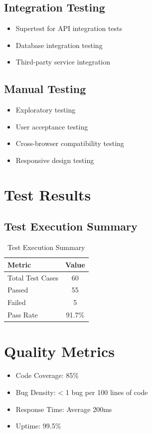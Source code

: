 \documentclass[12pt,a4paper]{report}
\begin{document}
\subsection{Integration Testing}
\begin{itemize}[leftmargin=*]
    \item Supertest for API integration tests
    \item Database integration testing
    \item Third-party service integration
\end{itemize}

\subsection{Manual Testing}
\begin{itemize}[leftmargin=*]
    \item Exploratory testing
    \item User acceptance testing
    \item Cross-browser compatibility testing
    \item Responsive design testing
\end{itemize}

\section{Test Results}
\subsection{Test Execution Summary}
\begin{table}[h]
\centering
\begin{tabular}{|l|c|}
\hline
\textbf{Metric} & \textbf{Value} \\
\hline
Total Test Cases & 60 \\
\hline
Passed & 55 \\
\hline
Failed & 5 \\
\hline
Pass Rate & 91.7\% \\
\hline
\end{tabular}
\caption{Test Execution Summary}
\end{table}

\section{Quality Metrics}
\begin{itemize}[leftmargin=*]
    \item Code Coverage: 85\%
    \item Bug Density: < 1 bug per 100 lines of code
    \item Response Time: Average 200ms
    \item Uptime: 99.5\%
\end{itemize}
\end{document}
